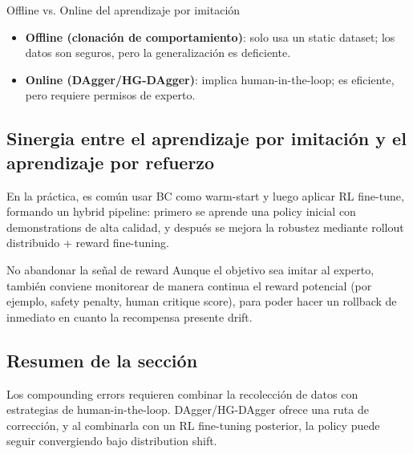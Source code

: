 \begin{knowledgebox}{Offline vs. Online del aprendizaje por imitación}
\begin{itemize}
    \item \textbf{Offline (clonación de comportamiento)}: solo usa un static dataset; los datos son seguros, pero la generalización es deficiente.
    \item \textbf{Online (DAgger/HG-DAgger)}: implica human-in-the-loop; es eficiente, pero requiere permisos de experto.
\end{itemize}
\end{knowledgebox}

\subsection{Sinergia entre el aprendizaje por imitación y el aprendizaje por refuerzo}

En la práctica, es común usar BC como warm-start y luego aplicar RL fine-tune, formando un hybrid pipeline: primero se aprende una policy inicial con demonstrations de alta calidad, y después se mejora la robustez mediante rollout distribuido + reward fine-tuning.

\begin{warningbox}{No abandonar la señal de reward}
Aunque el objetivo sea imitar al experto, también conviene monitorear de manera continua el reward potencial (por ejemplo, safety penalty, human critique score), para poder hacer un rollback de inmediato en cuanto la recompensa presente drift.
\end{warningbox}

\subsection{Resumen de la sección}

Los compounding errors requieren combinar la recolección de datos con estrategias de human-in-the-loop. DAgger/HG-DAgger ofrece una ruta de corrección, y al combinarla con un RL fine-tuning posterior, la policy puede seguir convergiendo bajo distribution shift.

